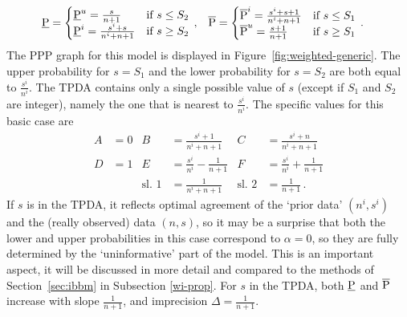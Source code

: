 \begin{align*}
\underline{\operatorname{P}} &=
  \begin{cases}
    \underline{\operatorname{P}}^u = \frac{s}{n+1}           & \text{if } s \leq S_2  \\
    \underline{\operatorname{P}}^i = \frac{s^i+s}{n^i+n+1}   & \text{if } s \geq S_2 
  \end{cases}\,, & 
\overline{\operatorname{P}} &=
  \begin{cases}
    \overline{\operatorname{P}}^i = \frac{s^i+s+1}{n^i+n+1} & \text{if } s \leq S_1  \\
    \overline{\operatorname{P}}^u = \frac{s+1}{n+1}         & \text{if } s \geq S_1 
  \end{cases} \,.
\end{align*}
The PPP graph for this model is displayed %
in Figure~\ref{fig:weighted-generic}.
The upper probability for $s=S_1$ and the lower probability for
$s=S_2$ are both equal to $\frac{s^i}{n^i}$. The TPDA
contains only a single possible value of $s$ (except if $S_1$ and $S_2$ are
integer), namely the one that is nearest to $\frac{s^i}{n^i}$. The specific
values for this basic case are %
\begin{align*}
A &= 0 &
B &= \frac{s^i+1}{n^i+n+1} &
C &= \frac{s^i+n}{n^i+n+1} \\
D &= 1 &
E &= \frac{s^i}{n^i}-\frac{1}{n+1} &
F &= \frac{s^i}{n^i}+\frac{1}{n+1} \\
& &
\text{sl.~1} &= \frac{1}{n^i+n+1} &
\text{sl.~2} &= \frac{1}{n+1}\,.
\end{align*}
If $s$ is in the TPDA, it reflects optimal
agreement of the `prior data' $(n^i,s^i)$ and the (really
observed) data $(n,s)$, so it may be a surprise that both the
lower and upper probabilities in this case correspond to $\alpha=0$,
so they are fully determined by the `uninformative' part of the
model. This is an important aspect, it will be discussed in more
detail and compared to the methods of Section~\ref{sec:ibbm} in
Subsection \ref{wi-prop}. For $s$ in the TPDA, both
$\underline{\operatorname{P}}$ and $\overline{\operatorname{P}}$ increase with slope $\frac{1}{n+1}$, and imprecision $\Delta = \frac{1}{n+1}$.

